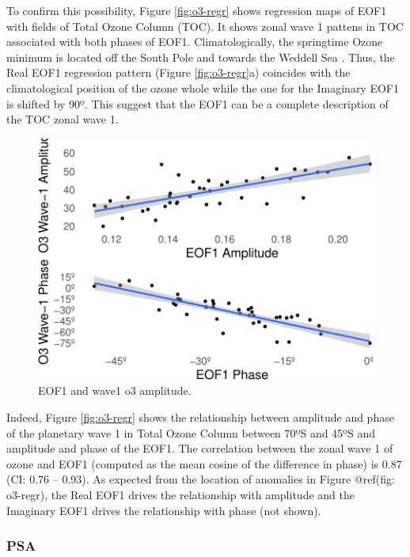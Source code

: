 \documentclass[smallextended]{svjour3}       %
\begin{document}
To confirm this possibility, Figure \ref{fig:o3-regr} shows regression maps of EOF1 with fields of Total Ozone Column (TOC). It shows zonal wave 1 pattens in TOC associated with both phases of EOF1. Climatologically, the springtime Ozone minimum is located off the South Pole and towards the Weddell Sea \citep{wirth1993}. Thus, the Real EOF1 regression pattern (Figure \ref{fig:o3-regr}a) coincides with the climatological position of the ozone whole while the one for the Imaginary EOF1 is shifted by 90º. This suggest that the EOF1 can be a complete description of the TOC zonal wave 1.

\begin{figure}
\centering
\includegraphics{../figures/wave1-o3-1.pdf}
\caption{\label{fig:wave1-o3}EOF1 and wave1 o3 amplitude.}
\end{figure}

Indeed, Figure \ref{fig:o3-regr} shows the relationship between amplitude and phase of the planetary wave 1 in Total Ozone Column between 70ºS and 45ºS and amplitude and phase of the EOF1. The correlation between the zonal wave 1 of ozone and EOF1 (computed as the mean cosine of the difference in phase) is 0.87 (CI: 0.76 -- 0.93). As expected from the location of anomalies in Figure @ref(fig: o3-regr), the Real EOF1 drives the relationship with amplitude and the Imaginary EOF1 drives the relationship with phase (not shown).

\hypertarget{psa}{%
\subsubsection{PSA}\label{psa}}
\end{document}
